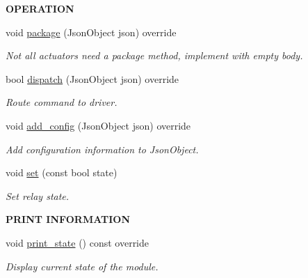 \begin{Indent}{\bf O\+P\+E\+R\+A\+T\+I\+ON}\par
\begin{DoxyCompactItemize}
\item 
void \hyperlink{class_loom___relay_ae3c0ac05a26917c832196205a7c2d7a9}{package} (Json\+Object json) override
\begin{DoxyCompactList}\small\item\em Not all actuators need a package method, implement with empty body. \end{DoxyCompactList}\item 
bool \hyperlink{class_loom___relay_a93ddf6a1c30244a81eaeb9332546e465}{dispatch} (Json\+Object json) override
\begin{DoxyCompactList}\small\item\em Route command to driver. \end{DoxyCompactList}\item 
void \hyperlink{class_loom___relay_a67c8d4bdf2f047917f5c5b05e4f64e58}{add\+\_\+config} (Json\+Object json) override
\begin{DoxyCompactList}\small\item\em Add configuration information to Json\+Object. \end{DoxyCompactList}\item 
void \hyperlink{class_loom___relay_aadab07b5c2d0c2bdc47c32d4eec4943a}{set} (const bool state)
\begin{DoxyCompactList}\small\item\em Set relay state. \end{DoxyCompactList}\end{DoxyCompactItemize}
\end{Indent}
\begin{Indent}{\bf P\+R\+I\+NT I\+N\+F\+O\+R\+M\+A\+T\+I\+ON}\par
\begin{DoxyCompactItemize}
\item 
void \hyperlink{class_loom___relay_a001fba3a442b2ef5792fe394eb1d78e4}{print\+\_\+state} () const override
\begin{DoxyCompactList}\small\item\em Display current state of the module. \end{DoxyCompactList}\end{DoxyCompactItemize}
\end{Indent}
